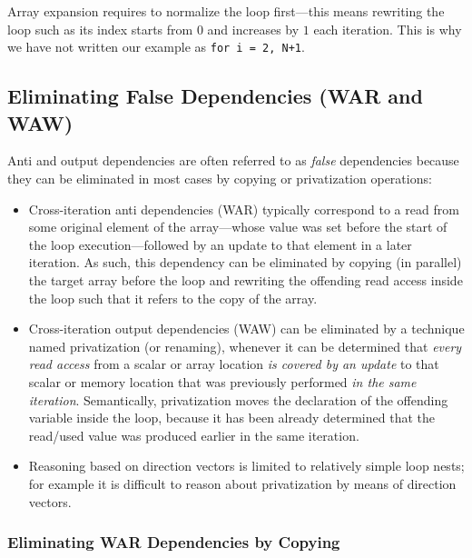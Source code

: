 \documentclass[acmsmall,review]{acmart}\settopmatter{printfolios=true,printccs=false,printacmref=false}
\begin{document}
Array expansion requires to normalize the loop first---this means
rewriting the loop such as its index starts from $0$ and increases
by $1$ each iteration. This is why we have not written our example
as \lstinline{for i = 2, N+1}.

\enlargethispage{\baselineskip}

\subsection{Eliminating False Dependencies (WAR and WAW)}
\label{subsec:false-dep-elim}

Anti and output dependencies are often referred to as {\em false}
dependencies because they can be eliminated in most cases by
copying or privatization operations:
\begin{itemize}
    \item Cross-iteration anti dependencies (WAR) typically
        correspond to a read from some original element of 
        the array---whose value was set before the start of 
        the loop execution---followed by an update to that 
        element in a later iteration.  As such, this dependency
        can be eliminated by copying (in parallel) the target
        array before the loop and rewriting the offending
        read access inside the loop such that it refers
        to the copy of the array.\smallskip

    \item Cross-iteration output dependencies (WAW) can be
        eliminated by a technique named privatization (or renaming), 
        whenever it can be determined that {\em every read access} 
        from a scalar or array location {\em is covered by an
        update} to that scalar or memory location that was
        previously performed {\em in the same iteration}. 
        Semantically, privatization moves the declaration of the
        offending variable inside the loop, because it has been
        already determined that the read/used value was produced
        earlier in the same iteration.\smallskip

    \item Reasoning based on direction vectors is limited to 
        relatively simple loop nests; for example it is difficult 
        to reason about privatization by means of direction vectors.
\end  {itemize}

\subsubsection{Eliminating WAR Dependencies by Copying}
$\mbox{ }$\\
\end{document}
